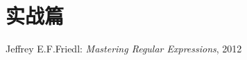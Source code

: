 \documentclass[a4paper]{book}
\begin{document}





\part{实战篇}

\begin{thebibliography}{99}
 Jeffrey E.F.Friedl: {\em Mastering Regular Expressions}, 2012
\end{thebibliography}


\cleardoublepage
{}

\printglossaries

\printindex



\end{document}

